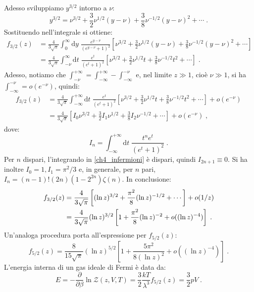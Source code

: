 \documentclass[10pt,a4paper]{report}
\theoremstyle{definition}
\numberwithin{equation}{section}
\newcommand{\diff}[1][]{\mathrm{d}#1}
\newcommand{\zpart}{\mathcal{Z}}
\begin{document}
Adesso sviluppiamo $y^{3/2}$ intorno a $\nu$:
\begin{equation}
y^{3/2}=\nu^{3/2}+\frac{3}{2}\nu^{1/2}(y-\nu)+\frac{3}{8}\nu^{-1/2}(y-\nu)^2+\cdots\;.
\end{equation}
Sostituendo nell'integrale si ottiene:
\begin{align*}
f_{3/2}(z)&=\frac{4}{3\sqrt{\pi}}\int_0^{\infty}\diff{y}\;\frac{e^{y-\nu}}{(e^{y-\nu}+1)^2}\left[\nu^{3/2}+\frac{3}{2}\nu^{1/2}(y-\nu)+\frac{3}{8}\nu^{-1/2}(y-\nu)^2+\cdots\right] \\
&=\frac{4}{3\sqrt{\pi}}\int_{-\nu}^{\infty}\diff{t}\;\frac{e^t}{(e^t+1)^2}\left[\nu^{3/2}+\frac{3}{2}\nu^{1/2}t+\frac{3}{8}\nu^{-1/2}t^2+\cdots\right]\;.
\end{align*}
Adesso, notiamo che $\int_{-\nu}^{+\infty}=\int_{-\infty}^{+\infty}-\int_{-\infty}^{-\nu}$ e, nel limite $z\gg 1$, cioè $\nu\gg 1$, si ha $\int_{-\infty}^{-\nu}=o(e^{-\nu})$, quindi:
\begin{align*}
f_{3/2}(z) &= \frac{4}{3\sqrt{\pi}}\int_{-\infty}^{+\infty}\diff{t}\; \frac{e^t}{(e^t+1)^2}\left[\nu^{3/2}+\frac{3}{2}\nu^{1/2}t+\frac{3}{8}\nu^{-1/2}t^2+\cdots\right]+o(e^{-\nu}) \\
&= \frac{4}{3\sqrt{\pi}}\left[ I_0\nu^{3/2}+\frac{3}{2}I_1\nu^{1/2}+\frac{3}{8}I_2\nu^{-1/2}+\cdots\right]+o(e^{-\nu})\;,
\end{align*}
dove:
\begin{equation}
I_n=\int_{-\infty}^{+\infty}\diff{t}\; \frac{t^ne^t}{(e^t+1)^2}\;. \label{ch4_infermioni}
\end{equation}
Per $n$ dispari, l'integrando in \eqref{ch4_infermioni} è dispari, quindi $I_{2n+1}\equiv 0$. Si ha inoltre $I_0=1,I_1=\pi^2/3$ e, in generale, per $n$ pari, $I_n=(n-1)!(2n)(1-2^{2n})\zeta(n)$. In conclusione:
\begin{align}
f_{3/2}(z)&=\frac{4}{3\sqrt{\pi}}\left[(\ln z)^{3/2}+\frac{\pi^2}{8}(\ln z)^{-1/2}+\cdots\right]+o(1/z) \notag \\
&= \frac{4}{3\sqrt{\pi}}(\ln z)^{3/2}\left[1+\frac{\pi^2}{8}(\ln z)^{-2}+o((\ln z)^{-4})\right]\;. \label{ch4_sviluppof32}
\end{align}
Un'analoga procedura porta all'espressione per $f_{5/2}(z)$:
\begin{equation}
f_{5/2}(z)=\frac{8}{15\sqrt{\pi}}(\ln z)^{5/2}\left[1+\frac{5\pi^2}{8(\ln z)^2}+o((\ln z)^{-4})\right]\;.
\end{equation}
L'energia interna di un gas ideale di Fermi è data da:
\begin{equation}
E=-\frac{\partial}{\partial\beta}\ln\zpart(z,V,T)=\frac{3}{2}\frac{kT}{\lambda^3}f_{5/2}(z)=\frac{3}{2}pV\;. \label{ch4_enintfermi}
\end{equation}
\end{document}
